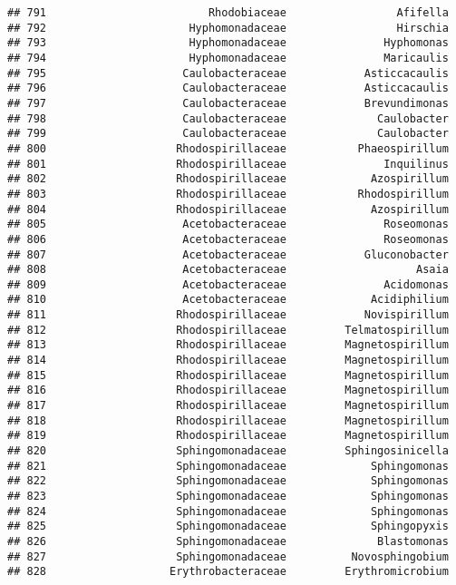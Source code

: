 \documentclass[
]{article}
\begin{document}
\begin{verbatim}
## 791                         Rhodobiaceae                 Afifella
## 792                      Hyphomonadaceae                 Hirschia
## 793                      Hyphomonadaceae               Hyphomonas
## 794                      Hyphomonadaceae               Maricaulis
## 795                     Caulobacteraceae            Asticcacaulis
## 796                     Caulobacteraceae            Asticcacaulis
## 797                     Caulobacteraceae            Brevundimonas
## 798                     Caulobacteraceae              Caulobacter
## 799                     Caulobacteraceae              Caulobacter
## 800                    Rhodospirillaceae           Phaeospirillum
## 801                    Rhodospirillaceae               Inquilinus
## 802                    Rhodospirillaceae             Azospirillum
## 803                    Rhodospirillaceae           Rhodospirillum
## 804                    Rhodospirillaceae             Azospirillum
## 805                     Acetobacteraceae               Roseomonas
## 806                     Acetobacteraceae               Roseomonas
## 807                     Acetobacteraceae            Gluconobacter
## 808                     Acetobacteraceae                    Asaia
## 809                     Acetobacteraceae               Acidomonas
## 810                     Acetobacteraceae             Acidiphilium
## 811                    Rhodospirillaceae            Novispirillum
## 812                    Rhodospirillaceae         Telmatospirillum
## 813                    Rhodospirillaceae         Magnetospirillum
## 814                    Rhodospirillaceae         Magnetospirillum
## 815                    Rhodospirillaceae         Magnetospirillum
## 816                    Rhodospirillaceae         Magnetospirillum
## 817                    Rhodospirillaceae         Magnetospirillum
## 818                    Rhodospirillaceae         Magnetospirillum
## 819                    Rhodospirillaceae         Magnetospirillum
## 820                    Sphingomonadaceae         Sphingosinicella
## 821                    Sphingomonadaceae             Sphingomonas
## 822                    Sphingomonadaceae             Sphingomonas
## 823                    Sphingomonadaceae             Sphingomonas
## 824                    Sphingomonadaceae             Sphingomonas
## 825                    Sphingomonadaceae             Sphingopyxis
## 826                    Sphingomonadaceae              Blastomonas
## 827                    Sphingomonadaceae          Novosphingobium
## 828                   Erythrobacteraceae         Erythromicrobium

\end{verbatim}
\end{document}

